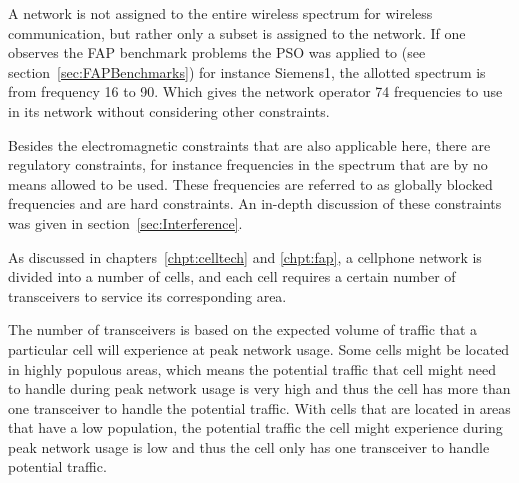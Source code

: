 A network is not assigned to the entire wireless spectrum for wireless communication, but rather only a subset is assigned to the network. If one observes the FAP benchmark problems the PSO was applied to (see section~\ref{sec:FAPBenchmarks}) for instance Siemens1, the allotted spectrum is from frequency 16 to 90. Which gives the network operator 74 frequencies to use in its network without considering other constraints. 

Besides the electromagnetic constraints that are also applicable here, there are regulatory constraints, for instance frequencies in the spectrum that are by no means allowed to be used. These frequencies are referred to as globally blocked frequencies and are hard constraints. An in-depth discussion of these constraints was given in section~\ref{sec:Interference}.

As discussed in chapters~\ref{chpt:celltech} and \ref{chpt:fap}, a cellphone network is divided into a number of cells, and each cell requires a certain number of transceivers to service its corresponding area. 

The number of transceivers is based on the expected volume of traffic that a particular cell will experience at peak network usage. Some cells might be located in highly populous areas, which means the potential traffic that cell might need to handle during peak network usage is very high and thus the cell has more than one transceiver to handle the potential traffic. With cells that are located in areas that have a low population, the potential traffic the cell might experience during peak network usage is low and thus the cell only has one transceiver to handle potential traffic.

